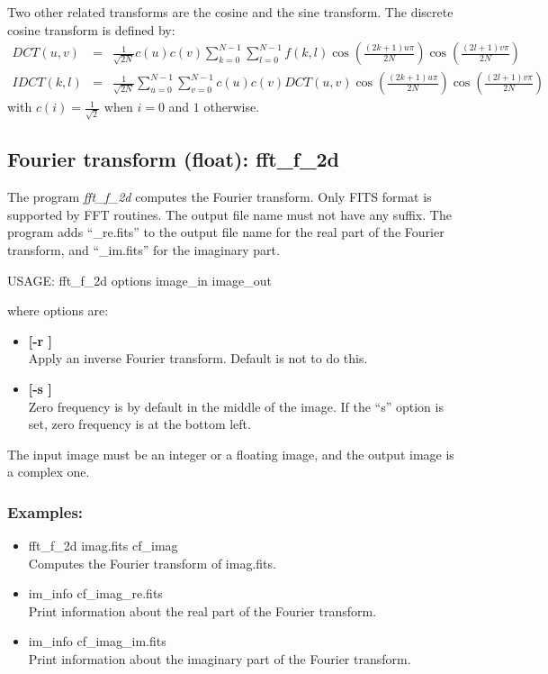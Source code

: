 Two other related transforms are the cosine and the sine transform.
The discrete cosine transform is defined by:
\begin{eqnarray*}
DCT(u,v) & = &  \frac{1}{\sqrt{2N}} c(u)c(v)
\sum_{k=0}^{N-1} \sum_{l=0}^{N-1} f(k,l) 
              \cos(\frac{(2k+1)u\pi}{2N})  \cos(\frac{(2l+1)v\pi }{2N}) \nonumber \\
IDCT(k,l) & = & \frac{1}{\sqrt{2N}}  
\sum_{u=0}^{N-1}\sum_{v=0}^{N-1} c(u)c(v) DCT(u,v) 
              \cos(\frac{(2k+1)u\pi}{2N})  \cos(\frac{(2l+1)v\pi }{2N})
\end{eqnarray*}
with $c(i) = \frac{1}{\sqrt{2}} $ when $i = 0$ and $1$ otherwise.


\subsection{Fourier transform (float): fft\_f\_2d}

The program 
{\em fft\_f\_2d} computes the Fourier transform. Only FITS format is supported
by FFT routines. The output file name must not have any suffix. The program
adds ``\_re.fits'' to the output file name for the real part of the Fourier 
transform, and ``\_im.fits'' for the imaginary part.  
{\bf
\begin{center}
USAGE: fft\_f\_2d options  image\_in  image\_out  
\end{center}}
where options are:
\begin{itemize}
\item {\bf[-r ]} \\
Apply an inverse Fourier transform. 
Default is not to do this.
\item {\bf[-s ]} \\
 Zero frequency is by default in the middle of the image.
 If the ``s'' option is set, zero frequency is at the bottom left.
\end{itemize}
The input image
must be an integer or a floating image, and the output image is a
complex one.
\subsubsection*{Examples:}
 \begin{itemize}
\item  fft\_f\_2d imag.fits cf\_imag \\
Computes the Fourier transform of imag.fits.
\item  im\_info cf\_imag\_re.fits \\
Print information about the real part of the Fourier transform.
\item  im\_info cf\_imag\_im.fits \\
Print information about the imaginary part of the Fourier transform.
\end{itemize}

